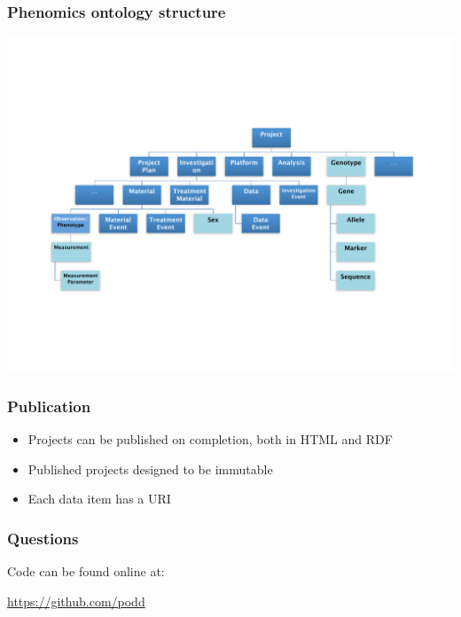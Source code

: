 \documentclass[12pt]{beamer}
\begin{document}
\begin{frame}
\frametitle{Phenomics ontology structure}

\begin{center}
 \includegraphics[scale=0.36,keepaspectratio=true]{./podd_ont.pdf}
\end{center}
\end{frame}

\begin{frame}
\frametitle{Publication}

\begin{itemize}
 \item Projects can be published on completion, both in HTML and RDF
\pause
 \item Published projects designed to be immutable
\pause
 \item Each data item has a URI
\end{itemize}
\end{frame}

\begin{frame}
\frametitle{Questions}

Code can be found online at:

\url{https://github.com/podd}

\end{frame}
\end{document}
